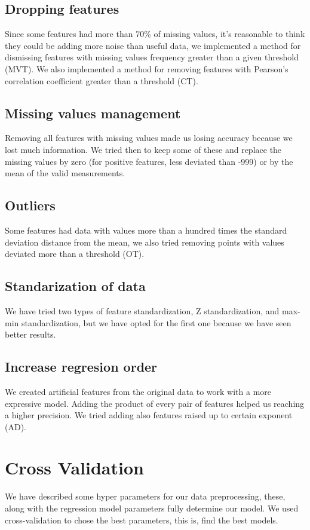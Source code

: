 \documentclass[10pt,conference,compsocconf]{IEEEtran}
\begin{document}
\subsection{Dropping features}
Since some features had more than 70\% of missing values, it's reasonable to think they could be adding more noise than useful data, we implemented a method for dismissing features with missing values frequency greater than a given threshold (MVT). We also implemented a method for removing features with Pearson's correlation coefficient greater than a threshold (CT).

\subsection{Missing values management}
Removing all features with missing values made us losing accuracy because we lost much information. We tried then to keep some of these and replace the missing values by zero (for positive features, less deviated than -999) or by the mean of the valid measurements.

\subsection{Outliers}
Some features had data with values more than a hundred times the standard deviation distance from the mean, we also tried removing points with values deviated more than a threshold (OT).

\subsection{Standarization of data}
We have tried two types of feature standardization, Z standardization, and max-min standardization, but we have opted for the first one because we have seen better results.

\subsection{Increase regresion order}
 We created artificial features from the original data to work with a more expressive model. Adding the product of every pair of features helped us reaching a higher precision. We tried adding also features raised up to certain exponent (AD).

\section{Cross Validation}
We have described some hyper parameters for our data preprocessing, these, along with the regression model parameters fully determine our model. We used cross-validation to chose the best parameters, this is, find the best models. 
\end{document}
